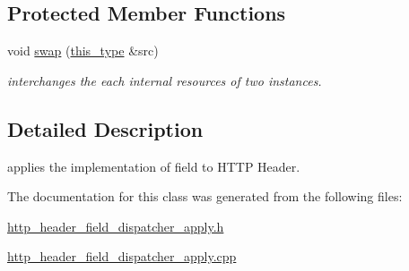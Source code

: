 \subsection*{Protected Member Functions}
\begin{DoxyCompactItemize}
\item 
\hypertarget{classhryky_1_1http_1_1header_1_1field_1_1dispatcher_1_1_base_ab2b137d16fbe40d839ee136bd5304cab}{void \hyperlink{classhryky_1_1http_1_1header_1_1field_1_1dispatcher_1_1_base_ab2b137d16fbe40d839ee136bd5304cab}{swap} (\hyperlink{classhryky_1_1http_1_1header_1_1field_1_1dispatcher_1_1_apply_a4d2826be199b8c44304035ecb71c4ccd}{this\-\_\-type} \&src)}\label{classhryky_1_1http_1_1header_1_1field_1_1dispatcher_1_1_base_ab2b137d16fbe40d839ee136bd5304cab}

\begin{DoxyCompactList}\small\item\em interchanges the each internal resources of two instances. \end{DoxyCompactList}\end{DoxyCompactItemize}


\subsection{Detailed Description}
applies the implementation of field to H\-T\-T\-P Header. 

The documentation for this class was generated from the following files\-:\begin{DoxyCompactItemize}
\item 
\hyperlink{http__header__field__dispatcher__apply_8h}{http\-\_\-header\-\_\-field\-\_\-dispatcher\-\_\-apply.\-h}\item 
\hyperlink{http__header__field__dispatcher__apply_8cpp}{http\-\_\-header\-\_\-field\-\_\-dispatcher\-\_\-apply.\-cpp}\end{DoxyCompactItemize}

